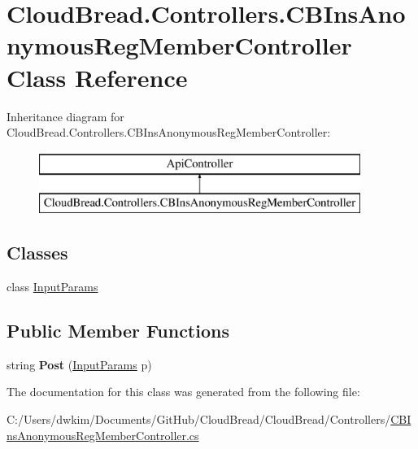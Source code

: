 \hypertarget{a00041}{}\section{Cloud\+Bread.\+Controllers.\+C\+B\+Ins\+Anonymous\+Reg\+Member\+Controller Class Reference}
\label{a00041}
Inheritance diagram for Cloud\+Bread.\+Controllers.\+C\+B\+Ins\+Anonymous\+Reg\+Member\+Controller\+:\begin{figure}[H]
\begin{center}
\leavevmode
\includegraphics[height=2.000000cm]{a00041}
\end{center}
\end{figure}
\subsection*{Classes}
\begin{DoxyCompactItemize}
\item 
class \hyperlink{a00115}{Input\+Params}
\end{DoxyCompactItemize}
\subsection*{Public Member Functions}
\begin{DoxyCompactItemize}
\item 
string {\bfseries Post} (\hyperlink{a00115}{Input\+Params} p)\hypertarget{a00041_aa0a9dad7adb9084a06daf2dd3dd829b4}{}\label{a00041_aa0a9dad7adb9084a06daf2dd3dd829b4}

\end{DoxyCompactItemize}


The documentation for this class was generated from the following file\+:\begin{DoxyCompactItemize}
\item 
C\+:/\+Users/dwkim/\+Documents/\+Git\+Hub/\+Cloud\+Bread/\+Cloud\+Bread/\+Controllers/\hyperlink{a00214}{C\+B\+Ins\+Anonymous\+Reg\+Member\+Controller.\+cs}\end{DoxyCompactItemize}
